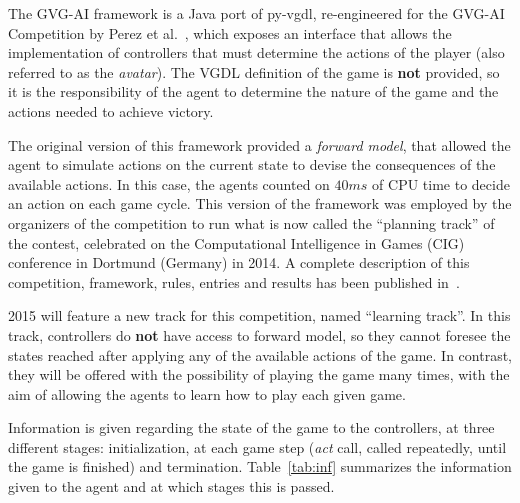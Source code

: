 \documentclass[conference]{IEEEtran}
\begin{document}
The GVG-AI framework is a Java port of py-vgdl, re-engineered for the GVG-AI Competition by Perez et al.~\cite{Perez2015}, which exposes an interface that allows the implementation of controllers that must determine the actions of the player (also referred to as the \textit{avatar}). The VGDL definition of the game is \textbf{not} provided, so it is the responsibility of the agent to determine the nature of the game and the actions needed to achieve victory. 

The original version of this framework provided a \textit{forward model}, that allowed the agent to simulate actions on the current state to devise the consequences of the available actions. In this case, the agents counted on $40ms$ of CPU time to decide an action on each game cycle. This version of the framework was employed by the organizers of the competition to run what is now called the ``planning track'' of the contest, celebrated on the Computational Intelligence in Games (CIG) conference in Dortmund (Germany) in 2014. A complete description of this competition, framework, rules, entries and results has been published in~\cite{Perez2015}.

2015 will feature a new track for this competition, named ``learning track''. In this track, controllers do \textbf{not} have access to forward model, so they cannot foresee the states reached after applying any of the available actions of the game. In contrast, they will be offered with the possibility of playing the game many times, with the aim of allowing the agents to learn how to play each given game. 

Information is given regarding the state of the game to the controllers, at three different stages: initialization, at each game step (\textit{act} call, called repeatedly, until the game is finished) and termination. Table~\ref{tab:inf} summarizes the information given to the agent and at which stages this is passed.
\end{document}
